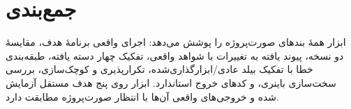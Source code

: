 \documentclass[12pt]{exam}
\begin{document}
\section{جمع‌بندی}

ابزار  همهٔ بندهای صورت‌پروژه را پوشش می‌دهد: اجرای واقعی برنامهٔ هدف،
مقایسهٔ دو نسخه، پیوند یافته به تغییرات با شواهد واقعی، تفکیک چهار دسته یافته،
طبقه‌بندی خطا با تفکیک بیلد عادی/ابزارگذاری‌شده، تکرارپذیری و کوچک‌سازی، بررسی
سخت‌سازی باینری، و کدهای خروج استاندارد. ابزار روی پنج هدف مستقل آزمایش شده و
خروجی‌های واقعی آن‌ها با انتظار صورت‌پروژه مطابقت دارد.
\end{document}
